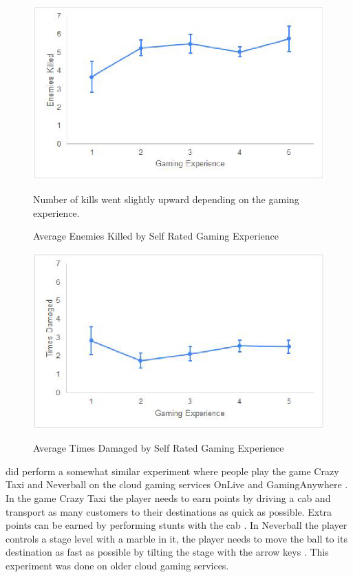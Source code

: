\begin{figure}[H]
	\centering
	\includegraphics[width=12cm]{../img/fig18.png}
	\caption{Average Enemies Killed by Self Rated Gaming Experience}
	Number of kills went slightly upward depending on the gaming experience.\\
	\parencite[Chapter 4.2.3, Page 41, Figure 18]{desveaux2020effects}
\end{figure}
\begin{figure}[H]
	\centering
	\includegraphics[width=12cm]{../img/fig19.png}
	\caption{Average Times Damaged by Self Rated Gaming Experience}
	\parencite[Chapter 4.2.3, Page 41, Figure 19]{desveaux2020effects}
\end{figure}
\newpage
\textcite{claypool2014effects} did perform a somewhat similar experiment where people play the game Crazy Taxi and Neverball on the cloud gaming services OnLive and GamingAnywhere \parencite[Chapter 3]{claypool2014effects}. In the game Crazy Taxi the player needs to earn points by driving a cab and transport as many customers to their destinations as quick as possible. Extra points can be earned by performing stunts with the cab \parencite[Chapter 3.A]{claypool2014effects}. In Neverball the player controls a stage level with a marble in it, the player needs to move the ball to its destination as fast as possible by tilting the stage with the arrow keys \parencite[Chapter 3.A]{claypool2014effects}. This experiment was done on older cloud gaming services.
